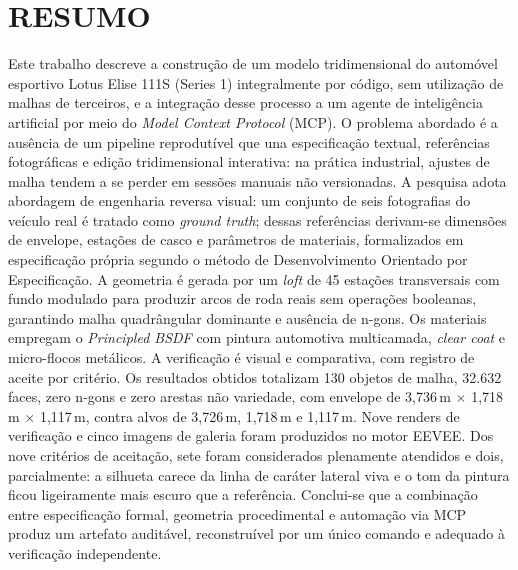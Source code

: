 \chapter*{RESUMO}
\thispagestyle{plain}

\SingleSpacing
\noindent
Este trabalho descreve a constru\c{c}\~ao de um modelo tridimensional do autom\'ovel esportivo
Lotus Elise 111S (Series 1) integralmente por c\'odigo, sem utiliza\c{c}\~ao de malhas de
terceiros, e a integra\c{c}\~ao desse processo a um agente de intelig\^encia artificial por meio do
\emph{Model Context Protocol} (MCP). O problema abordado \'e a aus\^encia de um pipeline
reprodut\'ivel que una especifica\c{c}\~ao textual, refer\^encias fotogr\'aficas e edi\c{c}\~ao
tridimensional interativa: na pr\'atica industrial, ajustes de malha tendem a se perder em
sess\~oes manuais n\~ao versionadas. A pesquisa adota abordagem de engenharia reversa visual:
um conjunto de seis fotografias do ve\'iculo real \'e tratado como \emph{ground truth}; dessas
refer\^encias derivam-se dimens\~oes de envelope, esta\c{c}\~oes de casco e par\^ametros de
materiais, formalizados em especifica\c{c}\~ao pr\'opria segundo o m\'etodo de Desenvolvimento
Orientado por Especifica\c{c}\~ao. A geometria \'e gerada por um \emph{loft} de 45 esta\c{c}\~oes
transversais com fundo modulado para produzir arcos de roda reais sem opera\c{c}\~oes booleanas,
garantindo malha quadr\^angular dominante e aus\^encia de n-gons. Os materiais empregam o
\emph{Principled BSDF} com pintura automotiva multicamada, \emph{clear coat} e micro-flocos
met\'alicos. A verifica\c{c}\~ao \'e visual e comparativa, com registro de aceite por crit\'erio.
Os resultados obtidos totalizam 130 objetos de malha, 32.632 faces, zero n-gons e zero arestas
n\~ao variedade, com envelope de 3,736\,m $\times$ 1,718\,m $\times$ 1,117\,m, contra alvos de
3,726\,m, 1,718\,m e 1,117\,m. Nove renders de verifica\c{c}\~ao e cinco imagens de galeria foram
produzidos no motor EEVEE. Dos nove crit\'erios de aceita\c{c}\~ao, sete foram considerados
plenamente atendidos e dois, parcialmente: a silhueta carece da linha de car\'ater lateral viva e
o tom da pintura ficou ligeiramente mais escuro que a refer\^encia. Conclui-se que a combina\c{c}\~ao
entre especifica\c{c}\~ao formal, geometria procedimental e automa\c{c}\~ao via MCP produz um
artefato audit\'avel, reconstru\'ivel por um \'unico comando e adequado \`a verifica\c{c}\~ao
independente.

